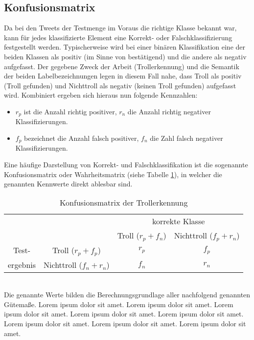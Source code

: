\subsection{Konfusionsmatrix}
Da bei den Tweets der Testmenge im Voraus die richtige Klasse bekannt war, kann für jedes klassifizierte Element eine Korrekt- oder Falschklassifizierung festgestellt werden. Typischerweise wird bei einer binären Klassifikation eine der beiden Klassen als positiv (im Sinne von \glqq bestätigend\grqq) und die andere als negativ aufgefasst. Der gegebene Zweck der Arbeit (Trollerkennung) und die Semantik der beiden Labelbezeichnungen legen in diesem Fall nahe, dass \glqq Troll\grqq{} als positiv (\glqq Troll gefunden\grqq) und \glqq Nichttroll\grqq{} als negativ (\glqq keinen Troll gefunden\grqq) aufgefasst wird. Kombiniert ergeben sich hieraus nun folgende Kennzahlen:
\begin{itemize}
\item $r_p$ ist die Anzahl richtig positiver, $r_n$ die Anzahl richtig negativer Klassifizierungen.
\item $f_p$ bezeichnet die Anzahl falsch positiver, $f_n$ die Zahl falsch negativer Klassifizierungen.
\end{itemize}
Eine häufige Darstellung von Korrekt- und Falschklassifikation ist die sogenannte Konfusionsmatrix oder Wahrheitsmatrix (siehe Tabelle \ref{confusion_matrix}), in welcher die genannten Kennwerte direkt ablesbar sind.
\begin{table}[htb]
	\begin{center}
		\begin{tabular}{c|c|c|c|}
			\multicolumn{2}{c}{}&\multicolumn{2}{c}{korrekte Klasse}\\
			\cline{2-4}
			&&Troll ($r_p + f_n$)&Nichttroll ($f_p + r_n$)\\
			\cline{2-4}
			Test-& Troll ($r_p + f_p$) & $r_p$ & $f_p$\\
			\cline{2-4}
			ergebnis& Nichttroll ($f_n + r_n$) &$f_n$ & $r_n$\\
			\cline{2-4}
		\end{tabular}
		\caption{Konfusionsmatrix der Trollerkennung}\label{confusion_matrix}
	\end{center}
\end{table}\\
Die genannte Werte bilden die Berechnungsgrundlage aller nachfolgend genannten Gütemaße. Lorem ipsum dolor sit amet. Lorem ipsum dolor sit amet. Lorem ipsum dolor sit amet. Lorem ipsum dolor sit amet. Lorem ipsum dolor sit amet. Lorem ipsum dolor sit amet. Lorem ipsum dolor sit amet. Lorem ipsum dolor sit amet.
